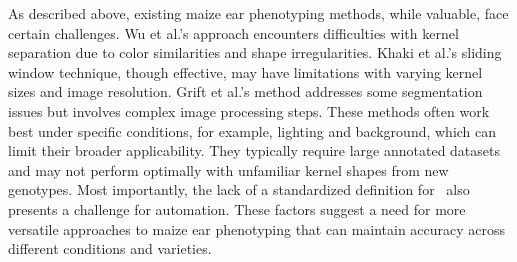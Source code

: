 
As described above, existing maize ear phenotyping methods, while valuable, face certain challenges. Wu et al.'s approach encounters difficulties with kernel separation due to color similarities and shape irregularities. Khaki et al.'s sliding window technique, though effective, may have limitations with varying kernel sizes and image resolution. Grift et al.'s method addresses some segmentation issues but involves complex image processing steps. These methods often work best under specific conditions, for example, lighting and background, which can limit their broader applicability. They typically require large annotated datasets and may not perform optimally with unfamiliar kernel shapes from new genotypes. Most importantly, the lack of a standardized definition for \KPR~also presents a challenge for automation. These factors suggest a need for more versatile approaches to maize ear phenotyping that can maintain accuracy across different conditions and varieties.